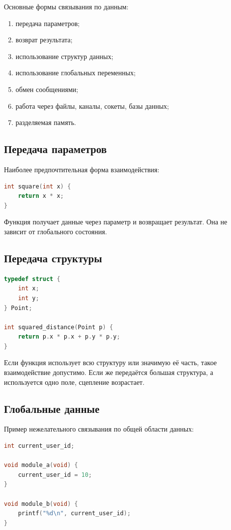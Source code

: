 \documentclass[12pt,a4paper]{article}
\begin{document}
Основные формы связывания по данным:
\begin{enumerate}
  \item передача параметров;
  \item возврат результата;
  \item использование структур данных;
  \item использование глобальных переменных;
  \item обмен сообщениями;
  \item работа через файлы, каналы, сокеты, базы данных;
  \item разделяемая память.
\end{enumerate}

\subsection{Передача параметров}

Наиболее предпочтительная форма взаимодействия:

\begin{lstlisting}[language=C]
int square(int x) {
    return x * x;
}
\end{lstlisting}

Функция получает данные через параметр и возвращает результат. Она не зависит от глобального состояния.

\subsection{Передача структуры}

\begin{lstlisting}[language=C]
typedef struct {
    int x;
    int y;
} Point;

int squared_distance(Point p) {
    return p.x * p.x + p.y * p.y;
}
\end{lstlisting}

Если функция использует всю структуру или значимую её часть, такое взаимодействие допустимо. Если же передаётся большая структура, а используется одно поле, сцепление возрастает.

\subsection{Глобальные данные}

Пример нежелательного связывания по общей области данных:

\begin{lstlisting}[language=C]
int current_user_id;

void module_a(void) {
    current_user_id = 10;
}

void module_b(void) {
    printf("%d\n", current_user_id);
}
\end{lstlisting}
\end{document}
